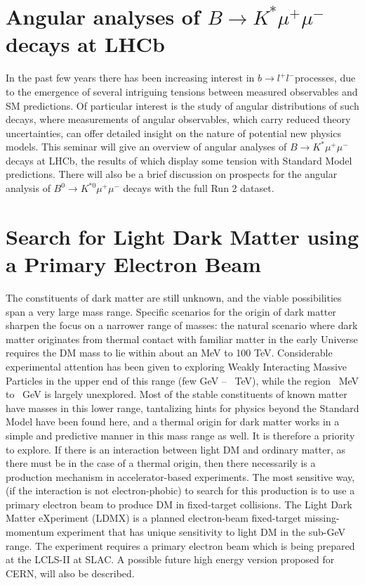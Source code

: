 \documentclass[12pt, a4paper, notitlepage, onecolumn]{article}
\begin{document}
\section{Angular analyses of $B\to K^*\mu^+\mu^-$ decays at LHCb}
\noindent In the past few years there has been increasing interest in $b\to l^+l^-$processes, due to the emergence of several intriguing tensions between measured observables and SM predictions. Of particular interest is the study of angular distributions of such decays, where measurements of angular observables, which carry reduced theory uncertainties, can offer detailed insight on the nature of potential new physics models. This seminar will give an overview of angular analyses of $B\to K^*\mu^+\mu^-$ decays at LHCb, the results of which display some tension with Standard Model predictions. There will also be a brief discussion on prospects for the angular analysis of $B^0\to K^{*0}\mu^+\mu^-$ decays with the full Run 2 dataset.

\section{Search for Light Dark Matter using a Primary Electron Beam}
\noindent The constituents of dark matter are still unknown, and the viable possibilities span a very large mass range. Specific scenarios for the origin of dark matter sharpen the focus on a narrower range of masses: the natural scenario where dark matter originates from thermal contact with familiar matter in the early Universe requires the DM mass to lie within about an MeV to 100 TeV. Considerable experimental attention has been given to exploring Weakly Interacting Massive Particles in the upper end of this range (few GeV – ~TeV), while the region ~MeV to ~GeV is largely unexplored. Most of the stable constituents of known matter have masses in this lower range, tantalizing hints for physics beyond the Standard Model have been found here, and a thermal origin for dark matter works in a simple and predictive manner in this mass range as well. It is therefore a priority to explore. If there is an interaction between light DM and ordinary matter, as there must be in the case of a thermal origin, then there necessarily is a production mechanism in accelerator-based experiments. The most sensitive way, (if the interaction is not electron-phobic) to search for this production is to use a primary electron beam to produce DM in fixed-target collisions. The Light Dark Matter eXperiment (LDMX) is a planned electron-beam fixed-target missing-momentum experiment that has unique sensitivity to light DM in the sub-GeV range. The experiment requires a primary electron beam which is being prepared at the LCLS-II at SLAC. A possible future high energy version proposed for CERN, will also be described.
\end{document}

